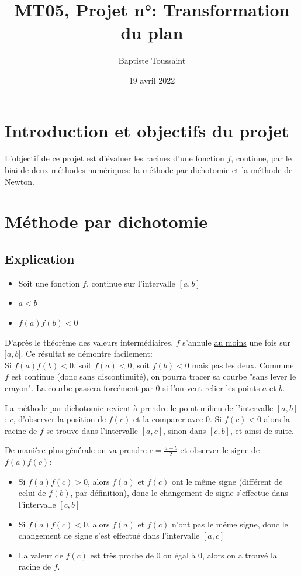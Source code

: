 \documentclass{article}
\title{MT05, Projet n°\numprojet{}: Transformation du plan}
\author{Baptiste Toussaint}
\affil{baptiste.toussaint@utt.fr}
\date{19 avril 2022}
\begin{document}
	\maketitle
	\thispagestyle{fancy}
	
	\tableofcontents
	
	\newpage	
	
	\section{Introduction et objectifs du projet}
	
	L'objectif de ce projet est d'évaluer les racines d'une fonction $f$, continue, par le biai de deux méthodes numériques: la méthode par dichotomie et la méthode de Newton.
	
	\section{Méthode par dichotomie}
	
	\subsection{Explication}
	
	\begin{itemize}
	\item Soit une fonction $f$, continue sur l'intervalle $[a,b]$
	\item $a<b$
	\item $f(a)f(b)<0$
	\end{itemize}
	
	D'après le théorème des valeurs intermédiaires, $f$ s'annule \underline{au moins} une fois sur $]a,b[$.
	Ce résultat se démontre facilement:\\
	Si $f(a)f(b)<0$, soit $f(a)<0$, soit $f(b)<0$
	mais pas les deux.
	Commme $f$ est continue (donc sans discontinuité), on pourra tracer sa courbe "sans lever le crayon". La courbe passera forcément par 0 si l'on veut relier les points $a$ et $b$.
	
	La méthode par dichotomie revient à prendre le point milieu de l'intervalle $[a,b]$: $c$, d'observer la position de $f(c)$ et la comparer avec 0. Si $f(c)<0$ alors la racine de $f$ se trouve dans l'intervalle $[a,c]$, sinon dans $[c,b]$, et ainsi de suite.
	
	De manière plus générale on va prendre $c=\frac{a+b}{2}$ et observer le signe de $f(a)f(c)$:
	\begin{itemize}
		\item Si $f(a)f(c) > 0$, alors $f(a)$ et $f(c)$ ont le même signe (différent de celui de $f(b)$, par définition),
		donc le changement de signe s'effectue dans l'intervalle $[c,b]$
		\item Si $f(a)f(c) < 0$, alors $f(a)$ et $f(c)$ n'ont pas le même signe,
		donc le changement de signe s'est effectué dans l'intervalle $[a,c]$
		\item La valeur de $f(c)$ est très proche de 0 ou égal à 0, alors on a trouvé la racine de $f$.
	\end{itemize}
	
\end{document}

